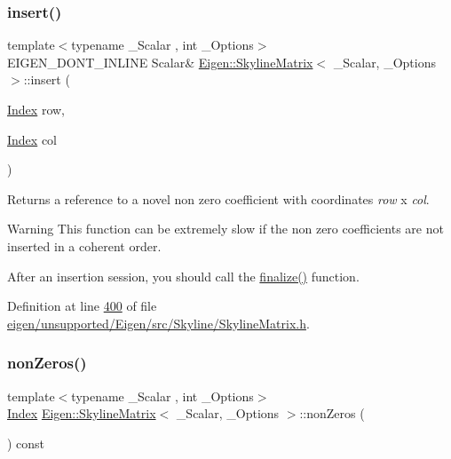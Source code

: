\subsubsection{\texorpdfstring{insert()}{insert()}\hspace{0.1cm}{\footnotesize\ttfamily [2/2]}}
{\footnotesize\ttfamily template$<$typename \+\_\+\+Scalar , int \+\_\+\+Options$>$ \\
E\+I\+G\+E\+N\+\_\+\+D\+O\+N\+T\+\_\+\+I\+N\+L\+I\+NE Scalar\& \hyperlink{class_eigen_1_1_skyline_matrix}{Eigen\+::\+Skyline\+Matrix}$<$ \+\_\+\+Scalar, \+\_\+\+Options $>$\+::insert (\begin{DoxyParamCaption}\item[{\hyperlink{group___core___module_a554f30542cc2316add4b1ea0a492ff02}{Index}}]{row,  }\item[{\hyperlink{group___core___module_a554f30542cc2316add4b1ea0a492ff02}{Index}}]{col }\end{DoxyParamCaption})\hspace{0.3cm}{\ttfamily [inline]}}

\begin{DoxyReturn}{Returns}
a reference to a novel non zero coefficient with coordinates {\itshape row} x {\itshape col}.
\end{DoxyReturn}
\begin{DoxyWarning}{Warning}
This function can be extremely slow if the non zero coefficients are not inserted in a coherent order.
\end{DoxyWarning}
After an insertion session, you should call the \hyperlink{class_eigen_1_1_skyline_matrix_a1269310d041fb3ca2a980644f3cfe5a2}{finalize()} function. 

Definition at line \hyperlink{eigen_2unsupported_2_eigen_2src_2_skyline_2_skyline_matrix_8h_source_l00400}{400} of file \hyperlink{eigen_2unsupported_2_eigen_2src_2_skyline_2_skyline_matrix_8h_source}{eigen/unsupported/\+Eigen/src/\+Skyline/\+Skyline\+Matrix.\+h}.

\mbox{\label{class_eigen_1_1_skyline_matrix_aea6d3b694cef560f15a7d18c1f010604}} 
\subsubsection{\texorpdfstring{non\+Zeros()}{nonZeros()}\hspace{0.1cm}{\footnotesize\ttfamily [1/2]}}
{\footnotesize\ttfamily template$<$typename \+\_\+\+Scalar , int \+\_\+\+Options$>$ \\
\hyperlink{group___core___module_a554f30542cc2316add4b1ea0a492ff02}{Index} \hyperlink{class_eigen_1_1_skyline_matrix}{Eigen\+::\+Skyline\+Matrix}$<$ \+\_\+\+Scalar, \+\_\+\+Options $>$\+::non\+Zeros (\begin{DoxyParamCaption}{ }\end{DoxyParamCaption}) const\hspace{0.3cm}{\ttfamily [inline]}}

